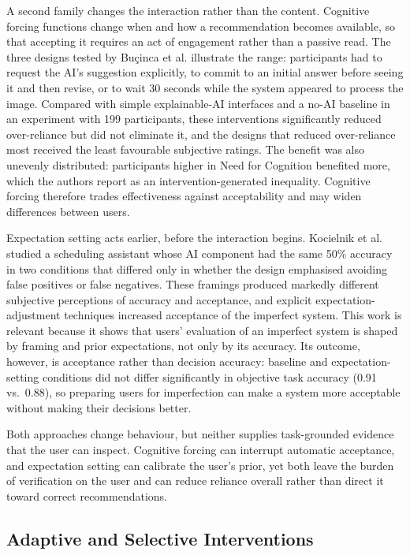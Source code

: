 \documentclass[oneside,final,14pt,a4paper]{extreport}
\begin{document}
A second family changes the interaction rather than the content. Cognitive
forcing functions change when and how a recommendation becomes available, so
that accepting it requires an act of engagement rather than a passive read. The
three designs tested by Bu\c{c}inca et al. \cite{Bucinca2021} illustrate the
range: participants had to request the AI's suggestion explicitly, to commit to
an initial answer before seeing it and then revise, or to wait 30 seconds while
the system appeared to process the image. Compared with simple explainable-AI
interfaces and a no-AI baseline in an experiment with 199 participants, these
interventions significantly reduced over-reliance but did not eliminate it, and
the designs that reduced over-reliance most received the least favourable
subjective ratings. The benefit was also unevenly distributed: participants higher in Need
for Cognition benefited more, which the authors report as an
intervention-generated inequality. Cognitive forcing therefore trades
effectiveness against acceptability and may widen differences between users.

Expectation setting acts earlier, before the interaction begins. Kocielnik et
al. \cite{Kocielnik2019} studied a scheduling assistant whose AI component had
the same 50\% accuracy in two conditions that differed only in whether the
design emphasised avoiding false positives or false negatives. These framings
produced markedly different subjective perceptions of accuracy and acceptance,
and explicit expectation-adjustment techniques increased acceptance of the
imperfect system. This work is relevant because it shows that users' evaluation
of an imperfect system is shaped by framing and prior expectations, not only by
its accuracy. Its outcome, however, is acceptance rather than decision accuracy:
baseline and expectation-setting conditions did not differ significantly in
objective task accuracy (0.91 vs.\ 0.88), so preparing users for imperfection
can make a system more acceptable without making their decisions better.

Both approaches change behaviour, but neither supplies task-grounded evidence
that the user can inspect. Cognitive forcing can interrupt automatic acceptance,
and expectation setting can calibrate the user's prior, yet both leave the
burden of verification on the user and can reduce reliance overall rather than
direct it toward correct recommendations.

\subsection{Adaptive and Selective Interventions}
\label{sec:lit-adaptive}
\end{document}
